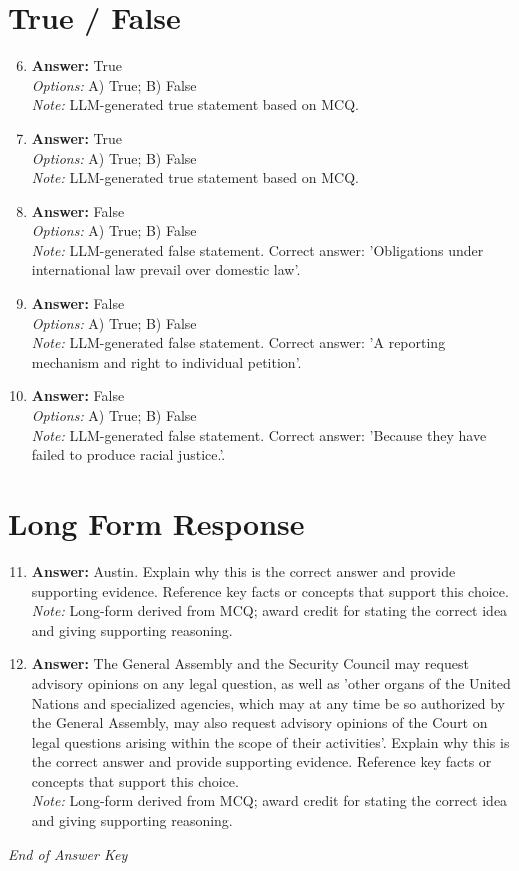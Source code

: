 \documentclass[12pt]{article}
\begin{document}
\section*{True / False}
\begin{enumerate}[label=\arabic*.]
\setcounter{enumi}{5}
\item \textbf{Answer:} True
\\ \textit{Options:} A) True; B) False
\\ \textit{Note:} LLM-generated true statement based on MCQ.
\item \textbf{Answer:} True
\\ \textit{Options:} A) True; B) False
\\ \textit{Note:} LLM-generated true statement based on MCQ.
\item \textbf{Answer:} False
\\ \textit{Options:} A) True; B) False
\\ \textit{Note:} LLM-generated false statement. Correct answer: 'Obligations under international law prevail over domestic law'.
\item \textbf{Answer:} False
\\ \textit{Options:} A) True; B) False
\\ \textit{Note:} LLM-generated false statement. Correct answer: 'A reporting mechanism and right to individual petition'.
\item \textbf{Answer:} False
\\ \textit{Options:} A) True; B) False
\\ \textit{Note:} LLM-generated false statement. Correct answer: 'Because they have failed to produce racial justice.'.
\end{enumerate}

\section*{Long Form Response}
\begin{enumerate}[label=\arabic*.]
\setcounter{enumi}{10}
\item \textbf{Answer:} Austin. Explain why this is the correct answer and provide supporting evidence. Reference key facts or concepts that support this choice.
\\ \textit{Note:} Long-form derived from MCQ; award credit for stating the correct idea and giving supporting reasoning.
\item \textbf{Answer:} The General Assembly and the Security Council may request advisory opinions on any legal question, as well as 'other organs of the United Nations and specialized agencies, which may at any time be so authorized by the General Assembly, may also request advisory opinions of the Court on legal questions arising within the scope of their activities'. Explain why this is the correct answer and provide supporting evidence. Reference key facts or concepts that support this choice.
\\ \textit{Note:} Long-form derived from MCQ; award credit for stating the correct idea and giving supporting reasoning.
\end{enumerate}

\vfill
\noindent\textit{End of Answer Key}
\end{document}
